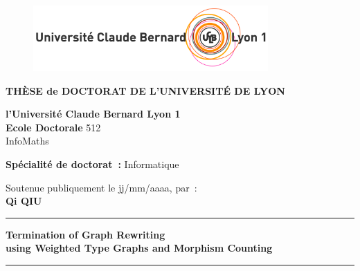 
\begin{titlepage}

    \unitlength 1cm
    \begin{center}
    
    \vspace*{-2.5cm}
    \begin{figure}[h]
        \centering
        \includegraphics[width=0.8\textwidth]{LogoLyon1Off_CoulCmjn300dpi.jpg}
    \end{figure}
    
               {\large\bf THÈSE de DOCTORAT DE L'UNIVERSITÉ DE LYON\\}
   
               {\large \bf l'Université Claude Bernard Lyon 1\\}
    \vspace{12pt}
               {\large \textbf{Ecole Doctorale} 512 \\InfoMaths}

    \vspace{12pt}
    
               {\large \textbf{Spécialité de doctorat~:} Informatique \\}
    
    \vspace{0.8cm}
    
               {Soutenue publiquement le jj/mm/aaaa, par~:\\}
               {\Large\bf {Qi QIU}}
    \vspace{0.5cm}           
    
    
    \rule{5cm}{1pt}
    
    \vspace{12pt}
               
               {\LARGE \bf Termination of Graph Rewriting}\\
               \vspace{0.3cm}
               {\Large \bf using Weighted Type Graphs and Morphism Counting}
               
    \vspace{12pt}
    \rule{5cm}{1pt}
    

\end{center}
\end{titlepage}
